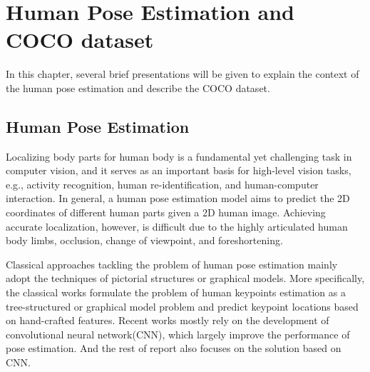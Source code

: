 \chapter{Human Pose Estimation and COCO dataset}
\label{sec:intro}
In this chapter, several brief presentations will be given to explain the context of the human pose estimation and describe the COCO dataset.

\section{Human Pose Estimation}
\label{sec:isauriam}
Localizing body parts for human body is a fundamental yet challenging task in computer vision, and it serves as an important basis for high-level vision tasks, e.g., activity
recognition\cite{yang2010recognizing, wang2013approach}, human re-identification\cite{zheng2017pose}, and human-computer interaction.
In general, a human pose estimation model aims to predict the 2D coordinates of different human parts given a 2D human image.
Achieving accurate localization, however, is difficult due to the highly articulated human body limbs, occlusion, change of viewpoint, and foreshortening.

Classical approaches tackling the problem of human pose estimation mainly adopt the techniques of pictorial structures \cite{fischler1973representation} or graphical models\cite{chen2014articulated}.
More specifically, the classical works\cite{andriluka2009pictorial, gkioxari2013articulated, sapp2013modec, johnson2011learning} formulate the problem of human keypoints estimation as a tree-structured or graphical model problem and predict keypoint locations based on hand-crafted features.
Recent works\cite{newell2016stacked, gkioxari2016chained, wei2016convolutional, insafutdinov2016deepercut} mostly rely on the development of convolutional neural network(CNN)\cite{lecun1998gradient, he2016deep}, which largely improve the performance of pose estimation.
And the rest of report also focuses on the solution based on CNN.

